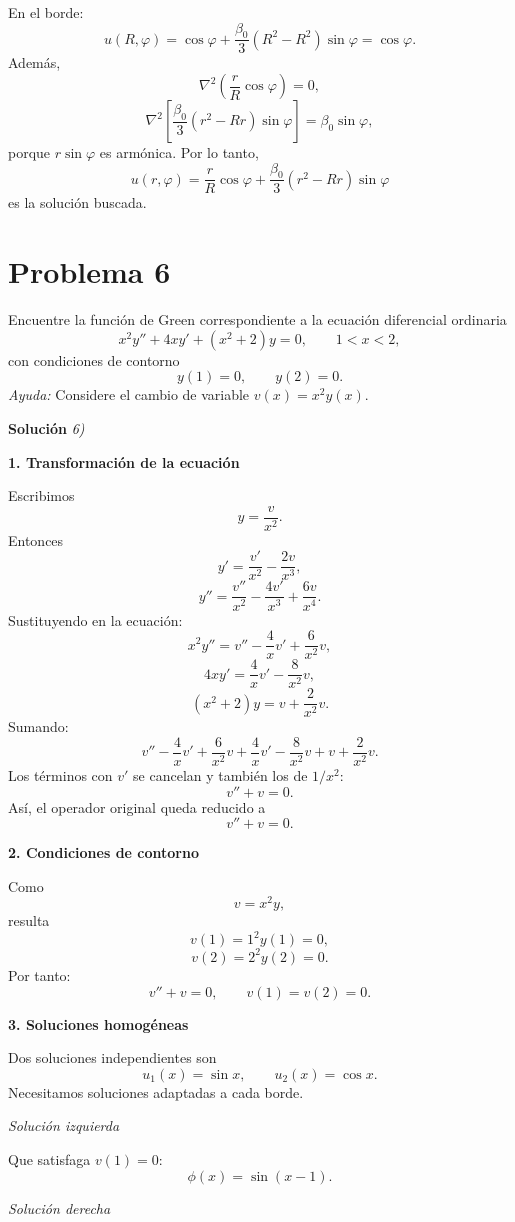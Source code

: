 \documentclass[12pt]{article}
\begin{document}
En el borde:
$$
u(R,\varphi)
=
\cos\varphi
+
\frac{\beta_0}{3}(R^2-R^2)\sin\varphi
=
\cos\varphi.
$$
Además,
$$
\nabla^2\left(\frac{r}{R}\cos\varphi\right)=0,
$$
$$
\nabla^2\left[\frac{\beta_0}{3}(r^2-Rr)\sin\varphi\right]
=
\beta_0\sin\varphi,
$$
porque $r\sin\varphi$ es armónica.
Por lo tanto,
$$
\boxed{
u(r,\varphi)
=
\frac{r}{R}\cos\varphi
+
\frac{\beta_0}{3}(r^2-Rr)\sin\varphi
}
$$
es la solución buscada.







\section*{Problema 6}

Encuentre la función de Green correspondiente a la ecuación diferencial ordinaria
\[
x^2 y'' + 4xy' + (x^2 + 2)y = 0, \qquad 1 < x < 2,
\]
con condiciones de contorno
\[
y(1) = 0, \qquad y(2) = 0.
\]
\textit{Ayuda:} Considere el cambio de variable \(v(x) = x^2 y(x)\).

\vspace{0.5cm}
{\bf Soluci\'on }{\em 6)}
\vspace{0.5cm}

{\bf 1. Transformación de la ecuación}

Escribimos
$$
y=\frac{v}{x^2}.
$$
Entonces
$$
y'
=\frac{v'}{x^2}-\frac{2v}{x^3},
$$
$$
y''
=\frac{v''}{x^2}
-\frac{4v'}{x^3}
+\frac{6v}{x^4}.
$$
Sustituyendo en la ecuación:
$$
x^2y''
=
v''
-\frac{4}{x}v'
+\frac{6}{x^2}v,
$$
$$
4xy'
=
\frac{4}{x}v'
-\frac{8}{x^2}v,
$$
$$
(x^2+2)y
=
v+\frac{2}{x^2}v.
$$
Sumando:
$$
v''
-\frac{4}{x}v'
+\frac{6}{x^2}v
+\frac{4}{x}v'
-\frac{8}{x^2}v
+v+\frac{2}{x^2}v.
$$
Los términos con $v'$ se cancelan y también los de $1/x^2$:
$$
v''+v=0.
$$
Así, el operador original queda reducido a
$$
\boxed{v''+v=0.}
$$

{\bf 2. Condiciones de contorno}

Como
$$
v=x^2y,
$$
resulta
$$
v(1)=1^2y(1)=0,
$$
$$
v(2)=2^2y(2)=0.
$$
Por tanto:
$$
\boxed{
v''+v=0,
\qquad
v(1)=v(2)=0.
}
$$

{\bf 3. Soluciones homogéneas}

Dos soluciones independientes son
$$
u_1(x)=\sin x,
\qquad
u_2(x)=\cos x.
$$
Necesitamos soluciones adaptadas a cada borde.

{\em Solución izquierda}

Que satisfaga $v(1)=0$:
$$
\phi(x)=\sin(x-1).
$$

{\em Solución derecha}
\end{document}
